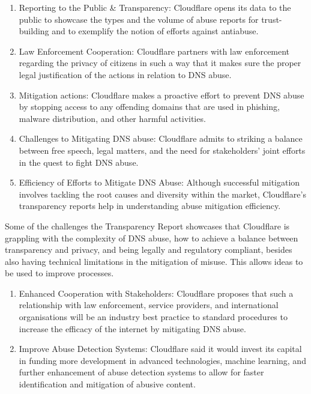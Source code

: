 \begin{enumerate}
\begin{enumerate}
\item Reporting to the Public \& Transparency: Cloudflare opens its data to the public to showcase the types and the volume of abuse reports for trust-building and to exemplify the notion of efforts against antiabuse.

\item Law Enforcement Cooperation: Cloudflare partners with law enforcement regarding the privacy of citizens in such a way that it makes sure the proper legal justification of the actions in relation to DNS abuse.


\item Mitigation actions: Cloudflare makes a proactive effort to prevent DNS abuse by stopping access to any offending domains that are used in phishing, malware distribution, and other harmful activities.

\item Challenges to Mitigating DNS abuse: Cloudflare admits to striking a balance between free speech, legal matters, and the need for stakeholders' joint efforts in the quest to fight DNS abuse.

\item Efficiency of Efforts to Mitigate DNS Abuse: Although successful mitigation involves tackling the root causes and diversity within the market, Cloudflare's transparency reports help in understanding abuse mitigation efficiency.

\end{enumerate}

Some of the challenges the Transparency Report showcases that Cloudflare is grappling with the complexity of DNS abuse, how to achieve a balance between transparency and privacy, and being legally and regulatory compliant, besides also having technical limitations in the mitigation of misuse. This allows ideas to be used to improve processes.

\begin{enumerate}
    \item Enhanced Cooperation with Stakeholders: Cloudflare proposes that such a relationship with law enforcement, service providers, and international organisations will be an industry best practice to standard procedures to increase the efficacy of the internet by mitigating DNS abuse.
    
    \item Improve Abuse Detection Systems: Cloudflare said it would invest its capital in funding more development in advanced technologies, machine learning, and further enhancement of abuse detection systems to allow for faster identification and mitigation of abusive content.
    

\end{enumerate}
\end{enumerate}
